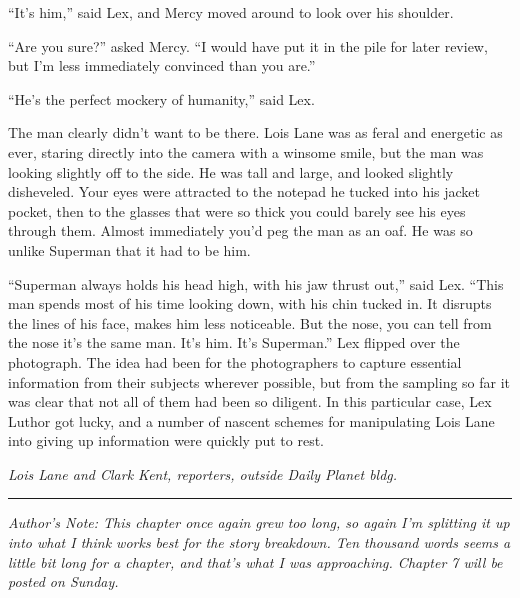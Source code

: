 ``It's him,'' said Lex, and Mercy moved around to look over his
shoulder.

``Are you sure?'' asked Mercy. ``I would have put it in the pile for
later review, but I'm less immediately convinced than you are.''

``He's the perfect mockery of humanity,'' said Lex.

The man clearly didn't want to be there. Lois Lane was as feral and
energetic as ever, staring directly into the camera with a winsome
smile, but the man was looking slightly off to the side. He was tall and
large, and looked slightly disheveled. Your eyes were attracted to the
notepad he tucked into his jacket pocket, then to the glasses that were
so thick you could barely see his eyes through them. Almost immediately
you'd peg the man as an oaf. He was so unlike Superman that it had to be
him.

``Superman always holds his head high, with his jaw thrust out,'' said
Lex. ``This man spends most of his time looking down, with his chin
tucked in. It disrupts the lines of his face, makes him less noticeable.
But the nose, you can tell from the nose it's the same man. It's him.
It's Superman.'' Lex flipped over the photograph. The idea had been for
the photographers to capture essential information from their subjects
wherever possible, but from the sampling so far it was clear that not
all of them had been so diligent. In this particular case, Lex Luthor
got lucky, and a number of nascent schemes for manipulating Lois Lane
into giving up information were quickly put to rest.

\emph{Lois Lane and Clark Kent, reporters, outside Daily Planet bldg.}

\begin{center}\rule{0.5\linewidth}{0.5pt}\end{center}

\emph{Author's Note: This chapter once again grew too long, so again I'm
splitting it up into what I think works best for the story breakdown.
Ten thousand words seems a little bit long for a chapter, and that's
what I was approaching. Chapter 7 will be posted on Sunday.}
